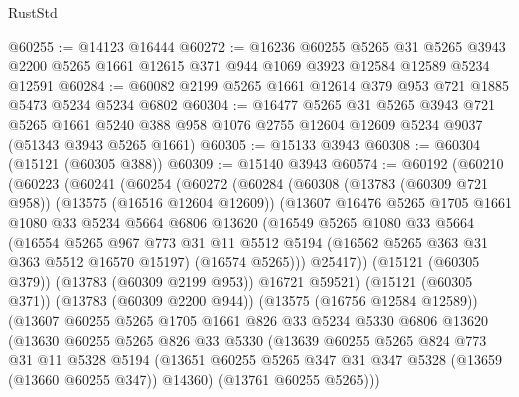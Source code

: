 \begin{lexlean}{RustStd}
\begin{coremodule}
@60255 := @14123 @16444
@60272 := @16236
    @60255
    @5265
    @31
    @5265
    @3943
    @2200
    @5265
    @1661
    @12615
    @371
    @944
    @1069
    @3923
    @12584
    @12589
    @5234
    @12591
@60284 := @60082 @2199 @5265 @1661 @12614 @379 @953 @721 @1885 @5473 @5234 @5234 @6802
@60304 := @16477
    @5265
    @31
    @5265
    @3943
    @721
    @5265
    @1661
    @5240
    @388
    @958
    @1076
    @2755
    @12604
    @12609
    @5234
    @9037
    (@51343 @3943 @5265 @1661)
@60305 := @15133 @3943
@60308 := @60304 (@15121 (@60305 @388))
@60309 := @15140 @3943
@60574 := @60192
    (@60210
      (@60223
        (@60241
          (@60254
            (@60272
              (@60284
                (@60308
                  (@13783 (@60309 @721 @958))
                  (@13575 (@16516 @12604 @12609))
                  (@13607
                    @16476
                    @5265
                    @1705
                    @1661
                    @1080
                    @33
                    @5234
                    @5664
                    @6806
                    @13620
                    (@16549
                      @5265
                      @1080
                      @33
                      @5664
                      (@16554
                        @5265
                        @967
                        @773
                        @31
                        @11
                        @5512
                        @5194
                        (@16562 @5265 @363 @31 @363 @5512 @16570 @15197)
                        (@16574 @5265)))
                    @25417))
                (@15121 (@60305 @379))
                (@13783 (@60309 @2199 @953))
                @16721
                @59521)
              (@15121 (@60305 @371))
              (@13783 (@60309 @2200 @944))
              (@13575 (@16756 @12584 @12589))
              (@13607
                @60255
                @5265
                @1705
                @1661
                @826
                @33
                @5234
                @5330
                @6806
                @13620
                (@13630
                  @60255
                  @5265
                  @826
                  @33
                  @5330
                  (@13639
                    @60255
                    @5265
                    @824
                    @773
                    @31
                    @11
                    @5328
                    @5194
                    (@13651 @60255 @5265 @347 @31 @347 @5328 (@13659 (@13660 @60255 @347)) @14360)
                    (@13761 @60255 @5265)))

\end{coremodule}
\end{lexlean}
